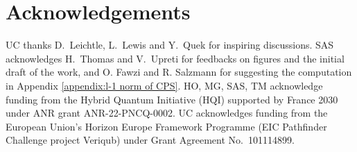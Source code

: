 \documentclass[a4paper,twocolumn,11pt,unpublished]{quantumarticle}
\begin{document}






 

 







\section*{Acknowledgements}

UC thanks D.\ Leichtle, L.\ Lewis and Y.\ Quek for inspiring discussions.
SAS acknowledges H.\ Thomas and V.\ Upreti for feedbacks on figures and the initial draft of the work, and O. Fawzi and R. Salzmann for suggesting the computation in Appendix \ref{appendix:l-1 norm of CPS}.
HO, MG, SAS, TM acknowledge funding from the Hybrid Quantum Initiative (HQI) supported by France 2030 under ANR grant ANR-22-PNCQ-0002.
UC acknowledges funding from the European Union’s Horizon Europe Framework Programme (EIC Pathfinder Challenge project Veriqub) under Grant Agreement No.~101114899.
\end{document}
